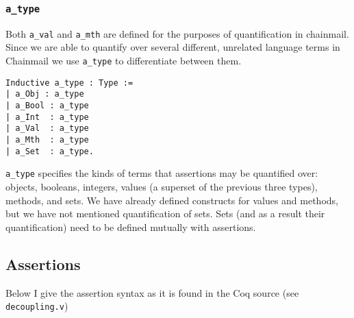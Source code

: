 \documentclass[12pt]{article}
\begin{document}
\subsubsection{\texttt{a\_type}}
Both \verb|a_val| and \verb|a_mth| are defined for the purposes of quantification in chainmail. Since we are able to quantify over several different, 
unrelated language terms in Chainmail we use \verb|a_type| to differentiate between them.
\begin{verbatim}
Inductive a_type : Type :=
| a_Obj : a_type
| a_Bool : a_type
| a_Int  : a_type
| a_Val  : a_type
| a_Mth  : a_type
| a_Set  : a_type.
\end{verbatim}
\verb|a_type| specifies the kinds of terms that assertions may be quantified over: objects, booleans, integers, values (a superset of the previous three types), methods, and sets.
We have already defined constructs for values and methods, but we have not mentioned quantification of sets. Sets (and as a result their quantification) need to be defined mutually 
with assertions.


\subsection{Assertions}
Below I give the assertion syntax as it is found in the Coq source (see \texttt{decoupling.v}) 
\end{document}
